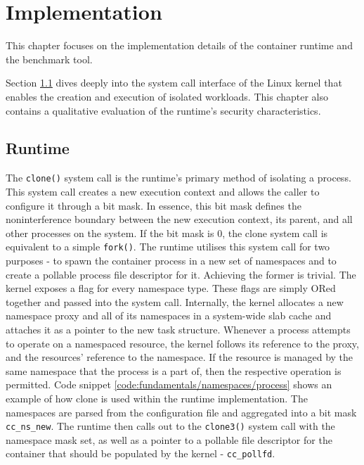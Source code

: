 \chapter{Implementation}
This chapter focuses on the implementation details of the container runtime 
and the benchmark tool. 

Section \ref{ch:implementation/runtime} dives deeply into the 
system call interface of the Linux kernel that enables the creation and execution 
of isolated workloads. This chapter also contains a qualitative evaluation of the runtime's 
security characteristics. 

\label{ch:implementation}
\section{Runtime}
\label{ch:implementation/runtime}
The \verb|clone()| system call is the runtime's primary method of isolating a process.
This system call creates a new execution context and allows the caller to configure it 
through a bit mask. In essence, this bit mask defines the noninterference boundary between 
the new execution context, its parent, and all other processes on the system. If the bit mask is 0, 
the clone system call is equivalent to a simple \verb|fork()|. The runtime utilises this 
system call for two purposes - to spawn the container process in a new set of namespaces and to 
create a pollable process file descriptor for it. 
Achieving the former is trivial. The kernel exposes a flag for every namespace type.
These flags are simply ORed together and passed into the system call. 
Internally, the kernel allocates a new namespace proxy and all of its namespaces 
in a system-wide slab cache and attaches it as a pointer to the new task structure.
Whenever a process attempts to operate on a namespaced resource, the kernel follows its reference to the 
proxy, and the resources' reference to the namespace. If the resource is managed by the same namespace 
that the process is a part of, then the respective operation is permitted.
Code snippet \ref{code:fundamentals/namespaces/process} shows an example of how clone is used 
within the runtime implementation. The namespaces are parsed from the configuration file and 
aggregated into a bit mask \verb|cc_ns_new|. The runtime then calls out to the \verb|clone3()| system call
with the namespace mask set, as well as a pointer to a pollable file descriptor for the 
container that should be populated by the kernel - \verb|cc_pollfd|. 

